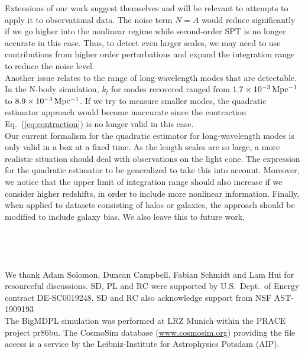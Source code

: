 \documentclass[prd,amsmath,amssymb,floatfix,superscriptaddress,nofootinbib,twocolumn]{revtex4-1}
\newcommand{\ec}[1]{Eq.~(\ref{eq:#1})}
\begin{document}
Extensions of our work suggest themselves and will be
relevant to attempts to apply it to observational data.
The noise term $N=A$ would reduce significantly if we go higher into the nonlinear regime while second-order SPT is no longer accurate in this case. Thus, to detect even larger scales, we may need to use contributions from higher order perturbations and expand the integration range to reduce the noise level. \\
Another issue relates to the range of long-wavelength modes that are detectable. In the N-body simulation,  $k_l$ for modes recovered ranged from
$1.7 \times 10^{-3} \, \rm Mpc^{-1}$ to $8.9\times 10^{-3} \, \rm Mpc^{-1}$.
If we try to measure smaller modes, the quadratic estimator approach would
become inaccurate since the contraction \ec{contraction} is no longer valid in this case.\\
Our current formalism for the quadratic estimator for long-wavelength modes is only valid in a box at a fixed time. As the length
scales are so large, a more realistic situation should deal with
observations on the light cone.
The expression for the quadratic estimator to be generalized to take this into account. Moreover, we notice that the upper limit of integration range should also increase if we consider higher redshifts, in order to include more nonlinear information. Finally, when applied to datasets consisting of
halos or galaxies, the approach should be modified to include galaxy bias. We
also leave this to future work.\\ 
\\ \\ \\ \\

\acknowledgements
\noindent We thank Adam Solomon, Duncan Campbell, Fabian Schmidt and Lam Hui for resourceful discussions.  SD, PL and RC were supported by U.S.\ Dept.\ of Energy contract DE-SC0019248. SD and RC also acknowledge support from NSF AST-1909193\\
The BigMDPL simulation was performed at LRZ Munich within the PRACE project pr86bu. The CosmoSim database (\url{www.cosmosim.org}) providing the file access is a service by the Leibniz-Institute for Astrophysics Potsdam (AIP).
%

\end{document}
